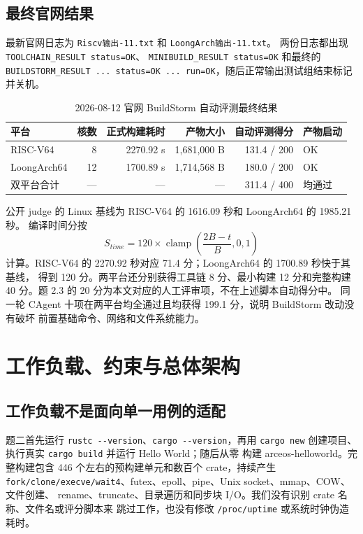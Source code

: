 \documentclass[UTF8,zihao=-4]{ctexart}
\newcommand{\code}{\nolinkurl}
\begin{document}
\subsection{最终官网结果}

最新官网日志为 \code{Riscv输出-11.txt} 和 \code{LoongArch输出-11.txt}。
两份日志都出现 \code{TOOLCHAIN_RESULT status=OK}、
\code{MINIBUILD_RESULT status=OK} 和最终的
\code{BUILDSTORM_RESULT ... status=OK ... run=OK}，随后正常输出测试组结束标记并关机。

\begin{table}[H]
\centering
\small
\begin{tabular}{lrrrrl}
\toprule
平台 & 核数 & 正式构建耗时 & 产物大小 & 自动评测得分 & 产物启动 \\
\midrule
RISC-V64 & 8 & 2270.92 s & 1,681,000 B & 131.4 / 200 & OK \\
LoongArch64 & 12 & 1700.89 s & 1,714,568 B & 180.0 / 200 & OK \\
\midrule
双平台合计 & --- & --- & --- & 311.4 / 400 & 均通过 \\
\bottomrule
\end{tabular}
\caption{2026-08-12 官网 BuildStorm 自动评测最终结果}
\label{tab:official-result}
\end{table}

公开 judge 的 Linux 基线为 RISC-V64 的 1616.09 秒和 LoongArch64 的 1985.21 秒。
编译时间分按
\[
S_{time}=120\times\operatorname{clamp}\left(\frac{2B-t}{B},0,1\right)
\]
计算。RISC-V64 的 2270.92 秒对应 71.4 分；LoongArch64 的 1700.89 秒快于其基线，
得到 120 分。两平台还分别获得工具链 8 分、最小构建 12 分和完整构建 40 分。题 2.3
的 20 分为本文对应的人工评审项，不在上述脚本自动得分中。
同一轮 CAgent 十项在两平台均全通过且均获得 199.1 分，说明 BuildStorm 改动没有破坏
前置基础命令、网络和文件系统能力。

\section{工作负载、约束与总体架构}

\subsection{工作负载不是面向单一用例的适配}

题二首先运行 \code{rustc --version}、\code{cargo --version}，再用
\code{cargo new} 创建项目、执行真实 \code{cargo build} 并运行 Hello World；随后从零
构建 arceos-helloworld。完整构建包含 446 个左右的预构建单元和数百个 crate，持续产生
\code{fork/clone/execve/wait4}、futex、epoll、pipe、Unix socket、mmap、COW、文件创建、
rename、truncate、目录遍历和同步块 I/O。我们没有识别 crate 名称、文件名或评分脚本来
跳过工作，也没有修改 \code{/proc/uptime} 或系统时钟伪造耗时。
\end{document}
